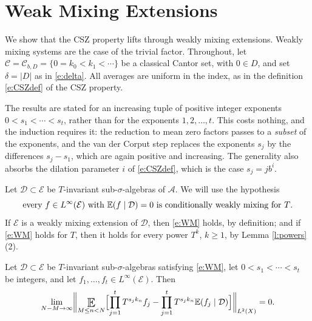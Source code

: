 \section{Weak Mixing Extensions} \label{sec:wm}

We show that the CSZ property lifts through weakly mixing extensions.  Weakly mixing systems are the case of the trivial factor.
Throughout, let $\mathcal C = \mathcal C_{b,D}=\{0=k_0<k_1<\cdots\}$ be a classical Cantor set, with $0\in D$, and set $\delta = \lvert D\rvert$ as in \eqref{e:delta}.
All averages are uniform in the index, as in the definition \eqref{e:CSZdef} of the CSZ property.

The results are stated for an increasing tuple of positive integer exponents $0<s_1 < \cdots < s_t$, rather than for the exponents $1,2 , \ldots, t$.
This costs nothing, and the induction requires it: the reduction to mean zero factors passes to a \emph{subset} of the exponents,
and the van der Corput step replaces the exponents $s_j$ by the differences $s_j - s_1$, which are again positive and increasing.
The generality also absorbs the dilation parameter $i$ of \eqref{e:CSZdef}, which is the case $s_j = j b ^{i}$.

Let $\mathcal D \subset \mathcal E$ be $T$-invariant sub-$\sigma$-algebras of $\mathcal A$.  We will use the hypothesis
\begin{equation} \label{e:WM}
\textup{every $f \in L ^{\infty}(\mathcal E)$ with $\mathbb E(f\mid \mathcal D) = 0$ is conditionally weakly mixing for $T$.}
\end{equation}
If $\mathcal E$ is a weakly mixing extension of $\mathcal D$, then \eqref{e:WM} holds, by definition;
and if \eqref{e:WM} holds for $T$, then it holds for every power $T ^{k}$, $k \geq 1$, by Lemma \ref{l:powers}(2).

\begin{lemma} \label{l:wmExtension}
Let $\mathcal D \subset \mathcal E$ be $T$-invariant sub-$\sigma$-algebras satisfying \eqref{e:WM},
let $0<s_1 < \cdots < s_t$ be integers, and let $f_1 ,\ldots, f_t\in L ^{\infty}(\mathcal E)$.   Then
\begin{equation} \label{e:wmConclusion}
  \lim_{N-M\to\infty}
  \biggl \lVert  \Expectation_{M\leq n<N}  \Bigl[ \prod _{j=1}^t
  T^{s_jk_n}f_j
  -  \prod _{j=1}^t
  T^{s_jk_n}\mathbb{E} (f_j \mid \mathcal D) \Bigr] \biggr\rVert _{L^2(X)} =0 .
  \end{equation}
\end{lemma}


